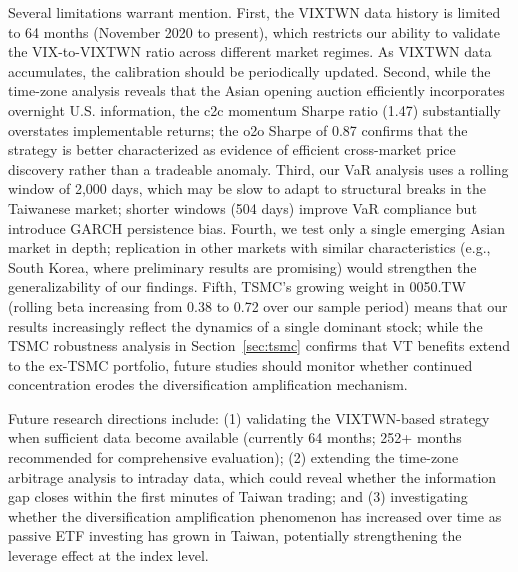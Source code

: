 Several limitations warrant mention. First, the VIXTWN data history is limited to 64 months (November 2020 to present), which restricts our ability to validate the VIX-to-VIXTWN ratio across different market regimes. As VIXTWN data accumulates, the calibration should be periodically updated. Second, while the time-zone analysis reveals that the Asian opening auction efficiently incorporates overnight U.S. information, the c2c momentum Sharpe ratio (1.47) substantially overstates implementable returns; the o2o Sharpe of 0.87 confirms that the strategy is better characterized as evidence of efficient cross-market price discovery rather than a tradeable anomaly. Third, our VaR analysis uses a rolling window of 2,000 days, which may be slow to adapt to structural breaks in the Taiwanese market; shorter windows (504 days) improve VaR compliance but introduce GARCH persistence bias. Fourth, we test only a single emerging Asian market in depth; replication in other markets with similar characteristics (e.g., South Korea, where preliminary results are promising) would strengthen the generalizability of our findings. Fifth, TSMC's growing weight in 0050.TW (rolling beta increasing from 0.38 to 0.72 over our sample period) means that our results increasingly reflect the dynamics of a single dominant stock; while the TSMC robustness analysis in Section~\ref{sec:tsmc} confirms that VT benefits extend to the ex-TSMC portfolio, future studies should monitor whether continued concentration erodes the diversification amplification mechanism.

Future research directions include: (1) validating the VIXTWN-based strategy when sufficient data become available (currently 64 months; 252+ months recommended for comprehensive evaluation); (2) extending the time-zone arbitrage analysis to intraday data, which could reveal whether the information gap closes within the first minutes of Taiwan trading; and (3) investigating whether the diversification amplification phenomenon has increased over time as passive ETF investing has grown in Taiwan, potentially strengthening the leverage effect at the index level.
